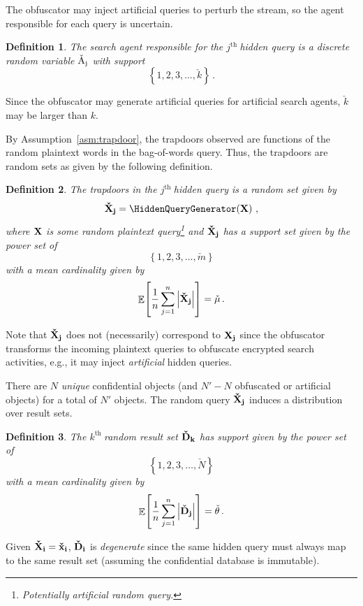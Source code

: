 \documentclass[final,11pt]{article}
\newcommand{\rvhrs}[1][]{%
   \ifthenelse{ \equal{#1}{} }
      {\ensuremath{\rv{\vec{\check{D}}}}}
      {\ensuremath{\rv{\vec{\check{D}_{#1}}}}}
}
\newcommand{\hqb}[1][]{%
   \ifthenelse{ \equal{#1}{} }
      {\ensuremath{\vec{\check{x}}}}
      {\ensuremath{\vec{\check{x}_{#1}}}}
}
\newcommand{\rvhqb}[1][]{%
   \ifthenelse{ \equal{#1}{} }
      {\ensuremath{\rv{\vec{\check{X}}}}}
      {\ensuremath{\rv{\vec{\check{X}_{#1}}}}}
}
\newcommand{\rvqb}[1][]{%
   \ifthenelse{ \equal{#1}{} }
      {\ensuremath{\rv{\vec{X}}}}
      {\ensuremath{\rv{\vec{X_{#1}}}}}
}
\newcommand{\rvhsa}[1][]{%
   \ifthenelse{ \equal{#1}{} }
      {\ensuremath{\rv{\check{A}}}}
      {\ensuremath{\rv{\check{A}_{#1}}}}
}
\newcommand{\rv}[1]{\mathrm{#1}}
\newcommand{\kth}{$k^{\text{th }}$}
\newcommand{\jth}{$j^{\text{th }}$}
\newcommand{\card}[1]{\left\vert{#1}\right\vert}
\renewcommand{\vec}[1]{\boldsymbol{\mathbf{#1}}}
\DeclareMathOperator{\expectation}{\mathbb{E}}
\numberwithin{equation}{section}
\theoremstyle{plain}
\newtheorem{definition}{Definition}[section]
\newtheorem{assumption}{Assumption}[section]
\theoremstyle{remark}
\begin{document}
The obfuscator may inject artificial queries to perturb the stream, so the agent responsible for each query is uncertain.
\begin{definition}
The search agent responsible for the \jth hidden query is a discrete random variable $\rvhsa[j]$ with support
\begin{equation}
    \left\{1,2,3,\ldots,\check{k}\right\}\,.
\end{equation}
\end{definition}
Since the obfuscator may generate artificial queries for artificial search agents, $\check{k}$ may be larger than $k$.

By Assumption~\ref{asm:trapdoor}, the trapdoors observed are functions of the random plaintext words in the bag-of-words query. Thus, the trapdoors are random sets as given by the following definition.
\begin{definition}
The trapdoors in the \jth hidden query is a random set given by
\begin{equation}
    \rvhqb[j] = \HiddenQueryGenerator\!\left(\rvqb\right)\,,
\end{equation}
where $\rvqb$ is some random plaintext query\footnote{Potentially artificial random query.} and $\rvhqb[j]$ has a support set given by the power set of
\begin{equation}
    \left\{1,2,3,\ldots,\check{m}\right\}
\end{equation}
with a mean cardinality given by
\begin{equation}
    \expectation\!\left[\frac{1}{n} \sum_{j=1}^{n} \card{\rvhqb[j]}\right] = \check{\mu}\,.
\end{equation}
\end{definition}
Note that $\rvhqb[j]$ does not (necessarily) correspond to $\rvqb[j]$ since the obfuscator transforms the incoming plaintext queries to obfuscate encrypted search activities, e.g., it may inject \emph{artificial} hidden queries.

There are $N$ \emph{unique} confidential objects (and $N' - N$ obfuscated or artificial objects) for a total of $N'$ objects. The random query $\rvhqb[j]$ induces a distribution over result sets.
\begin{definition}
The \kth random result set $\rvhrs[k]$ has support given by the power set of
\begin{equation}
    \left\{1,2,3,\ldots,\check{N}\right\}
\end{equation}
with a mean cardinality given by
\begin{equation}
    \expectation\!\left[\frac{1}{n} \sum_{j=1}^{n} \card{\rvhrs[j]}\right] = \check{\theta}\,.
\end{equation}
\end{definition}
Given $\rvhqb[i] = \hqb[i]$, $\rvhrs[i]$ is \emph{degenerate} since the same hidden query must always map to the same result set (assuming the confidential database is immutable).
\end{document}
